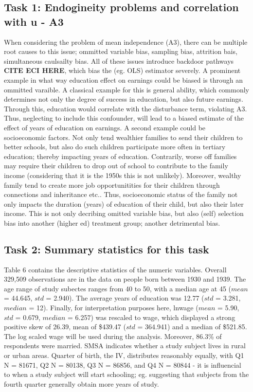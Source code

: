 \documentclass[a4paper]{article}
\begin{document}
\subsection{Task 1: Endogineity problems and correlation with u - A3}
When considering the problem of mean independence (A3), there can be multiple root causes to this issue; ommitted variable bias, sampling bias, attrition bais, simultaneous caulsailty bias. All of these issues introduce backdoor pathways \textbf{CITE ECI HERE}, which bias the (eg. OLS) estimator severely. 
A prominent example in what way education effect on earnings could be biased is through an ommitted varaible. A classical example for this is general ability, which commonly determines not only the degree of success in education, but also future earnings. Through this, education would correlate with the disturbance term, violating A3. Thus, neglecting to include this confounder, will lead to a biased estimate of the effect of years of education on earnings.
A second example could be socioeconomic factors. Not only tend wealthier families to send their children to better schools, but also do such children participate more often in tertiary education; thereby impacting years of education. Contrarily, worse off families may require their children to drop out of school to contribute to the family income (considering that it is the 1950s this is not unlikely). Moreover, wealthy family tend to create more job opportunitities for their children through connections and inheritance etc.. Thus, socioeconomic status of the family not only impacts the duration (years) of education of their child, but also their later income. This is not only decribing omitted variable bias, but also (self) selection bias into another (higher ed) treatment group; another detrimental bias.

\subsection{Task 2: Summary statistics for this task}

Table 6 contains the descriptive statistics of the numeric variables. Overall 329,509 observations are in the data on people born between 1930 and 1939. The age range of study subectes ranges from 40 to 50, with a median age at 45 ($mean$ = 44.645, $std$ = 2.940). The average years of education was 12.77 ($std$ = 3.281, $median$ = 12). Finally, for interpretation purposes here, lnwage ($mean$ = 5.90, $std$ = 0.679, $median$ = 6.257) was rescaled to wage, which displayed a strong positive skew of 26.39, mean of \$439.47 ($std$ = 364.941) and a median of \$521.85. The log scaled wage will be used during the analysis. 
Moreover, 86.3\% of respondents were married. SMSA indicates whether a study subject lives in rural or urban areas. Quarter of birth, the IV, distributes reasonably equally, with Q1 N = 81671, Q2 N = 80138, Q3 N = 86856, and Q4 N = 80844 - it is influencial to when a study subject will start schooling; eg. suggesting that subjects from the fourth quarter generally obtain more years of study.  
\end{document}
